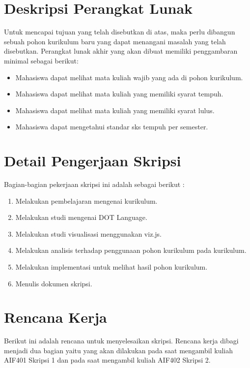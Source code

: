 \documentclass[a4paper,twoside]{article}
\begin{document}
\section{Deskripsi Perangkat Lunak}
Untuk mencapai tujuan yang telah disebutkan di atas, maka perlu dibangun sebuah pohon kurikulum baru yang dapat menangani masalah yang telah disebutkan. Perangkat lunak akhir yang akan dibuat memiliki penggambaran minimal sebagai berikut:

\begin{itemize}
	\item Mahasiswa dapat melihat mata kuliah wajib yang ada di pohon kurikulum.
	\item Mahasiswa dapat melihat mata kuliah yang memiliki syarat tempuh.
	\item Mahasiswa dapat melihat mata kuliah yang memiliki syarat lulus.
	\item Mahasiswa dapat mengetahui standar sks tempuh per semester.
\end{itemize}

\section{Detail Pengerjaan Skripsi}
Bagian-bagian pekerjaan skripsi ini adalah sebagai berikut :
	\begin{enumerate}
		\item Melakukan pembelajaran mengenai kurikulum.
		\item Melakukan studi mengenai DOT Language.
		\item Melakukan studi visualisasi menggunakan viz.js.
		\item Melakukan analisis terhadap penggunaan pohon kurikulum pada kurikulum.
		\item Melakukan implementasi untuk melihat hasil pohon kurikulum.
		\item Menulis dokumen skripsi.
	\end{enumerate}

\section{Rencana Kerja}
Berikut ini adalah rencana untuk menyelesaikan skripsi. Rencana kerja dibagi menjadi dua bagian yaitu
yang akan dilakukan pada saat mengambil kuliah AIF401 Skripsi 1 dan pada saat mengambil kuliah AIF402
Skripsi 2.
\end{document}
